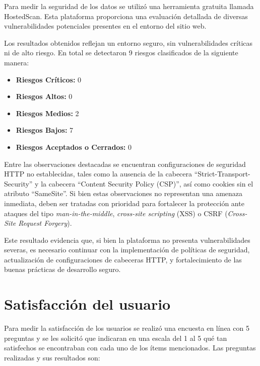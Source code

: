 \documentclass[12pt,a4paper]{article}
\begin{document}
Para medir la seguridad de los datos se utilizó una herramienta gratuita llamada HostedScan.
Esta plataforma proporciona una evaluación detallada de diversas vulnerabilidades
potenciales presentes en el entorno del sitio web.

Los resultados obtenidos reflejan un entorno seguro, sin vulnerabilidades críticas ni de alto
riesgo. En total se detectaron 9 riesgos clasificados de la siguiente manera:

\begin{itemize}
  \item \textbf{Riesgos Críticos:} 0
  \item \textbf{Riesgos Altos:} 0
  \item \textbf{Riesgos Medios:} 2
  \item \textbf{Riesgos Bajos:} 7
  \item \textbf{Riesgos Aceptados o Cerrados:} 0
\end{itemize}

Entre las observaciones destacadas se encuentran configuraciones de seguridad HTTP no
establecidas, tales como la ausencia de la cabecera ``Strict-Transport-Security'' y la cabecera
``Content Security Policy (CSP)'', así como cookies sin el atributo ``SameSite''. Si bien estas
observaciones no representan una amenaza inmediata, deben ser tratadas con prioridad para
fortalecer la protección ante ataques del tipo \textit{man-in-the-middle}, \textit{cross-site scripting} (XSS)
o CSRF (\textit{Cross-Site Request Forgery}).

Este resultado evidencia que, si bien la plataforma no presenta vulnerabilidades severas, es
necesario continuar con la implementación de políticas de seguridad, actualización de
configuraciones de cabeceras HTTP, y fortalecimiento de las buenas prácticas de desarrollo
seguro.

\section{Satisfacción del usuario}

Para medir la satisfacción de los usuarios se realizó una encuesta en línea con 5 preguntas y se
les solicitó que indicaran en una escala del 1 al 5 qué tan satisfechos se encontraban con cada
uno de los ítems mencionados. Las preguntas realizadas y sus resultados son:
\end{document}
